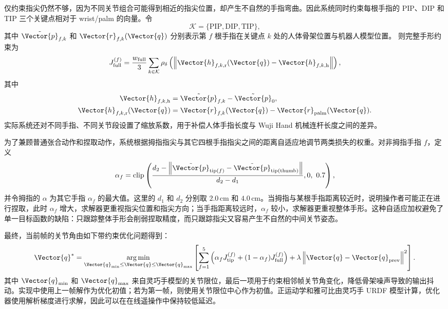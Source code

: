 仅约束指尖仍然不够，因为不同关节组合可能得到相近的指尖位置，却产生不自然的手指弯曲。因此系统同时约束每根手指的 PIP、DIP 和 TIP 三个关键点相对于 wrist/palm 的向量。令
\[
    \mathcal{K}=\{\mathrm{PIP},\mathrm{DIP},\mathrm{TIP}\},
\]
其中 $\tilde{\Vector{p}}_{f,k}$ 和 $\Vector{r}_{f,k}(\Vector{q})$ 分别表示第 $f$ 根手指在关键点 $k$ 处的人体骨架位置与机器人模型位置。
则完整手形约束为
\begin{equation}
    J_{\mathrm{full}}^{(f)} =
    \frac{w_{\mathrm{full}}}{3}
    \sum_{k\in\mathcal{K}}
    \rho_{\delta}
    \left(
        \left\|
        \Vector{h}_{f,k,\mathrm{r}}(\Vector{q})-
        \Vector{h}_{f,k,\mathrm{h}}
        \right\|
    \right),
\end{equation}
其中
\begin{align}
    \Vector{h}_{f,k,\mathrm{h}} &=
    \tilde{\Vector{p}}_{f,k}-\tilde{\Vector{p}}_0,\\
    \Vector{h}_{f,k,\mathrm{r}}(\Vector{q}) &=
    \Vector{r}_{f,k}(\Vector{q})-
    \Vector{r}_{\mathrm{palm}}(\Vector{q}) .
\end{align}
实际系统还对不同手指、不同关节段设置了缩放系数，用于补偿人体手指长度与 Wuji Hand 机械连杆长度之间的差异。

为了兼顾普通张合动作和捏取动作，系统根据拇指指尖与其它四根手指指尖之间的距离自适应地调节两类损失的权重。对非拇指手指 $f$，定义
\begin{equation}
    \alpha_f =
    \operatorname{clip}
    \left(
        \frac{d_2 -
            \left\|
            \tilde{\Vector{p}}_{\mathrm{tip}(f)}-
            \tilde{\Vector{p}}_{\mathrm{tip}(\mathrm{thumb})}
        \right\|}
        {d_2-d_1},
        0,\ 0.7
    \right),
\end{equation}
并令拇指的 $\alpha$ 为其它手指 $\alpha_f$ 的最大值。这里的 $d_1$ 和 $d_2$ 分别取 $2.0\,\mathrm{cm}$ 和 $4.0\,\mathrm{cm}$。当拇指与某根手指距离较近时，说明操作者可能正在进行捏取，此时 $\alpha_f$ 增大，求解器更重视指尖位置和指尖方向；当手指距离较远时，$\alpha_f$ 较小，求解器更重视整体手形。这种自适应加权避免了单一目标函数的缺陷：只跟踪整体手形会削弱捏取精度，而只跟踪指尖又容易产生不自然的中间关节姿态。

最终，当前帧的关节角由如下带约束优化问题得到：
\begin{equation}
    \Vector{q}^{*} =
    \operatorname*{arg\,min}_{\Vector{q}_{\min}\le\Vector{q}\le\Vector{q}_{\max}}
    \left[
        \sum_{f=1}^{5}
        \left(
            \alpha_f J_{\mathrm{tip}}^{(f)}
            +(1-\alpha_f)J_{\mathrm{full}}^{(f)}
        \right)
        +
        \lambda
        \left\|
        \Vector{q}-\Vector{q}_{\mathrm{prev}}
        \right\|^2
    \right].
\end{equation}
其中 $\Vector{q}_{\min}$ 和 $\Vector{q}_{\max}$ 来自灵巧手模型的关节限位，最后一项用于约束相邻帧关节角变化，降低骨架噪声导致的输出抖动。实现中使用上一帧解作为优化初值；若为第一帧，则使用关节限位中心作为初值。正运动学和雅可比由灵巧手 URDF 模型计算，优化器使用解析梯度进行求解，因此可以在在线遥操作中保持较低延迟。

